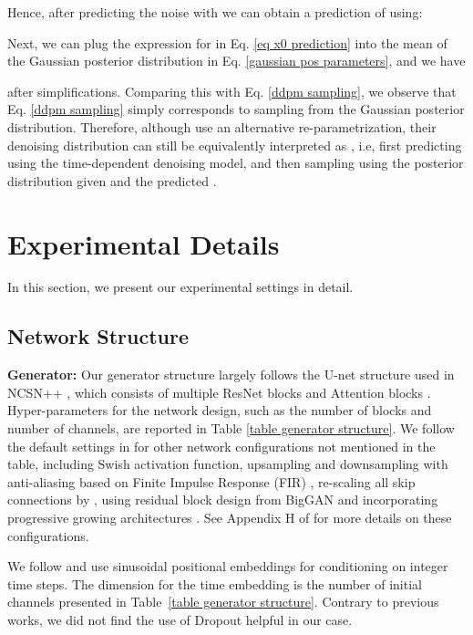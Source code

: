 Hence, after predicting the noise with  we can obtain a prediction of  using:



Next, we can plug the expression for  in Eq. \ref{eq x0 prediction} into the mean of the Gaussian posterior distribution in Eq. \ref{gaussian pos parameters}, and we have 

after simplifications. Comparing this with Eq. \ref{ddpm sampling}, we observe that Eq. \ref{ddpm sampling} simply corresponds to sampling from the Gaussian posterior distribution. Therefore, although \citet{ho2020denoising} use an alternative re-parametrization, their denoising distribution can still be equivalently interpreted as , i.e, first predicting  using the time-dependent denoising model, and then sampling  using the posterior distribution  given  and the predicted .


\section{Experimental Details} \label{app experimental detail}
In this section, we present our experimental settings in detail. 

\subsection{Network Structure}
\textbf{Generator: }Our generator structure largely follows the U-net structure \citep{ronneberger2015u} used in NCSN++ \citep{song2020score}, which consists of multiple ResNet blocks \citep{he2016deep} and Attention blocks \citep{vaswani2017attention}. Hyper-parameters for the network design, such as the number of blocks and number of channels, are reported in Table \ref{table generator structure}. We follow the default settings in \citet{song2020score} for other network configurations not mentioned in the table, including Swish activation function, upsampling and downsampling with anti-aliasing based on Finite Impulse Response (FIR) \citep{zhang2019making}, re-scaling all skip connections by , using residual block design from BigGAN \citep{brock2018large} and incorporating progressive growing architectures \citep{karras2020analyzing}. 
See Appendix H of \citet{song2020score} for more details on these configurations.

We follow \citet{ho2020denoising} and use sinusoidal positional
embeddings for conditioning on integer time steps. The dimension for the time embedding is  the number of initial channels presented in Table~\ref{table generator structure}. Contrary to previous works, we did not find the use of Dropout helpful in our case.

